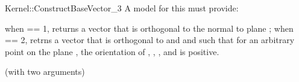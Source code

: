 \begin{ccRefFunctionObjectConcept}{Kernel::ConstructBaseVector_3}
A model for this must provide:


{when  == 1, returns a vector  that is orthogonal to the 
 normal  to plane ; when  == 2, retrns a vector 
  that is orthogonal to  and  and such that
 for an arbitrary point  on the plane , the orientation of
 , , , and  is positive.}

\ccRefines
{} (with two arguments)

\ccSeeAlso
{}  \\

\end{ccRefFunctionObjectConcept}
